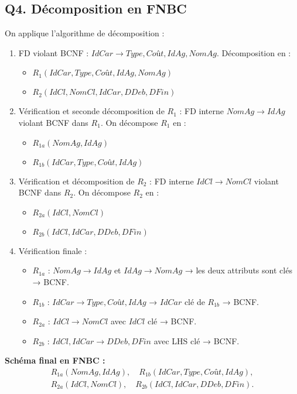 \documentclass[a4paper,11pt]{article}
\begin{document}
\subsection*{Q4. Décomposition en FNBC}
On applique l'algorithme de décomposition :
\begin{enumerate}
  \item FD violant BCNF : $IdCar\to Type,Coût,IdAg,NomAg$.  
    Décomposition en :
    \begin{itemize}
      \item $R_1(IdCar,Type,Coût,IdAg,NomAg)$
      \item $R_2(IdCl,NomCl,IdCar,DDeb,DFin)$
    \end{itemize}
  \item Vérification et seconde décomposition de $R_1$ :  
    FD interne $NomAg\to IdAg$ violant BCNF dans $R_1$.  
    On décompose $R_1$ en :
    \begin{itemize}
      \item $R_{1a}(NomAg,IdAg)$
      \item $R_{1b}(IdCar,Type,Coût,IdAg)$
    \end{itemize}
  \item Vérification et décomposition de $R_2$ :  
    FD interne $IdCl\to NomCl$ violant BCNF dans $R_2$.  
    On décompose $R_2$ en :
    \begin{itemize}
      \item $R_{2a}(IdCl,NomCl)$
      \item $R_{2b}(IdCl,IdCar,DDeb,DFin)$
    \end{itemize}
  \item Vérification finale :
    \begin{itemize}
      \item $R_{1a}$ : $NomAg\to IdAg$ et $IdAg\to NomAg$ → les deux attributs sont clés → BCNF.
      \item $R_{1b}$ : $IdCar\to Type,Coût,IdAg$ → $IdCar$ clé de $R_{1b}$ → BCNF.
      \item $R_{2a}$ : $IdCl\to NomCl$ avec $IdCl$ clé → BCNF.
      \item $R_{2b}$ : $IdCl,IdCar\to DDeb,DFin$ avec LHS clé → BCNF.
    \end{itemize}
\end{enumerate}

\noindent\textbf{Schéma final en FNBC :}
\begin{align*}
R_{1a}(NomAg,IdAg), \quad
R_{1b}(IdCar,Type,Coût,IdAg),\\
R_{2a}(IdCl,NomCl), \quad
R_{2b}(IdCl,IdCar,DDeb,DFin).
\end{align*}
\end{document}
